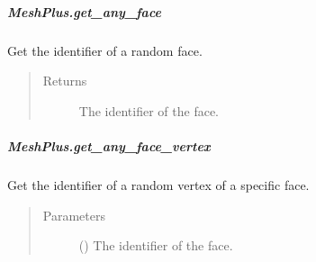 \documentclass[letterpaper,10pt,english]{sphinxmanual}
\begin{document}
\begin{fulllineitems}
\begin{fulllineitems}
\end{fulllineitems}



\subparagraph{MeshPlus.get\_any\_face}
\label{\detokenize{api/generated/directional_clustering.mesh.MeshPlus.get_any_face:meshplus-get-any-face}}\label{\detokenize{api/generated/directional_clustering.mesh.MeshPlus.get_any_face::doc}}

\begin{fulllineitems}
\label{\detokenize{api/generated/directional_clustering.mesh.MeshPlus.get_any_face:directional_clustering.mesh.MeshPlus.get_any_face}}
Get the identifier of a random face.
\begin{quote}\begin{description}
\item[{Returns}] \leavevmode
{} \textendash{} The identifier of the face.

\end{description}\end{quote}

\end{fulllineitems}



\subparagraph{MeshPlus.get\_any\_face\_vertex}
\label{\detokenize{api/generated/directional_clustering.mesh.MeshPlus.get_any_face_vertex:meshplus-get-any-face-vertex}}\label{\detokenize{api/generated/directional_clustering.mesh.MeshPlus.get_any_face_vertex::doc}}

\begin{fulllineitems}
\label{\detokenize{api/generated/directional_clustering.mesh.MeshPlus.get_any_face_vertex:directional_clustering.mesh.MeshPlus.get_any_face_vertex}}
Get the identifier of a random vertex of a specific face.
\begin{quote}\begin{description}
\item[{Parameters}] \leavevmode
{} () \textendash{} The identifier of the face.


\end{description}
\end{quote}
\end{fulllineitems}
\end{fulllineitems}
\end{document}
